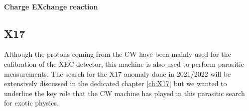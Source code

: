 \begin{refsection}
        \paragraph{Charge EXchange reaction}

    \subsection{X17}
        Although the protons coming from the CW have been mainly used for the calibration of the XEC detector, this machine is also used to perform parasitic measurements.
        The search for the X17 anomaly done in 2021/2022 will be extensively discussed in the dedicated chapter \ref{ch:X17} but we wanted to underline the key role that the CW machine has played in this parasitic search for exotic physics. 


\end{refsection}
